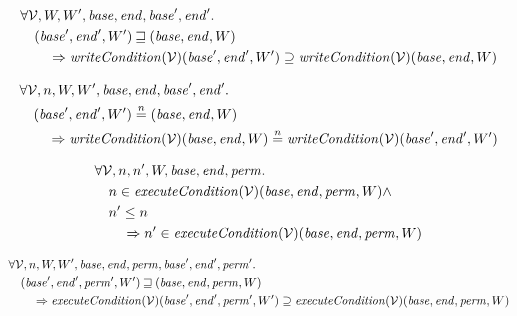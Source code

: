 \documentclass[a4paper]{article}
\newcommand{\nequal}[1][n]{\stackrel{\tiny{#1}}{=}}
\newcommand{\var}[1]{\mathit{#1}}
\newcommand{\start}{\var{base}}
\newcommand{\addrend}{\var{end}}
\newcommand{\perm}{\var{perm}}
\newcommand{\plainfun}[2]{
  \ifthenelse{\equal{#2}{}}
             {\mathit{#1}}
             {\mathit{#1}(#2)}
}
\newcommand{\writeCond}[1]{\plainfun{writeCondition}{#1}}
\newcommand{\execCond}[1]{\plainfun{executeCondition}{#1}}
\newcommand{\future}{\mathbin{\sqsupseteq}}
\newcommand{\asmType}{\plaindom{AsmType}}
\newcommand{\plaindom}[1]{\mathrm{#1}}
\newcommand{\intr}[2]{\mathcal{#1}}
\newcommand{\valueintr}[1]{\intr{V}{#1}}
\newcommand{\stdvr}{\valueintr{\asmType}}
\begin{document}
\begin{lemma}
\label{lem:wc-mono-world}
  \begin{align*}
    &\forall \stdvr,W,W',\start, \addrend, \start',\addrend' \ldotp \\
    &\quad  (\start',\addrend',W') \future (\start,\addrend,W) \\
    &\qquad \Rightarrow \writeCond{}(\stdvr)(\start',\addrend',W') \supseteq \writeCond{}(\stdvr)(\start,\addrend,W)
  \end{align*}
\end{lemma}

\begin{lemma}
  \label{lem:wc-ne-world}
  \begin{align*}
    &\forall \stdvr, n,W,W',\start, \addrend, \start',\addrend' \ldotp \\
    &\quad  (\start',\addrend',W') \nequal (\start,\addrend,W) \\
    &\qquad \Rightarrow \writeCond{}(\stdvr)(\start,\addrend,W) \nequal \writeCond{}(\stdvr)(\start',\addrend',W')
  \end{align*}
\end{lemma}

\begin{lemma}
\label{lem:ec-dc}
  \begin{align*}
    &\forall \stdvr, n,n',W,\start, \addrend, \perm \ldotp \\
    &\quad  n \in \execCond{}(\stdvr)(\start,\addrend,\perm,W) \land \\
    &\quad  n' \leq n \\
    &\qquad \Rightarrow n' \in \execCond{}(\stdvr)(\start,\addrend,\perm,W)
  \end{align*}
\end{lemma}

\begin{lemma}
\label{lem:ec-mono-world}
  \begin{align*}
    &\forall \stdvr,n,W, W',\start, \addrend, \perm,\start', \addrend', \perm' \ldotp \\
    &\quad  (\start',\addrend',\perm',W') \future (\start,\addrend,\perm,W) \\
    &\qquad \Rightarrow \execCond{}(\stdvr)(\start',\addrend',\perm',W') \supseteq \execCond{}(\stdvr)(\start,\addrend,\perm,W)
  \end{align*}
\end{lemma}
\end{document}
